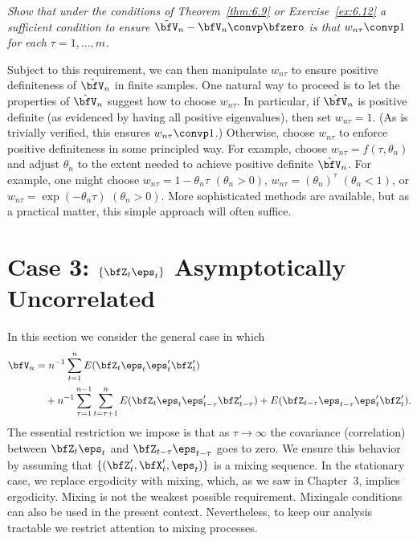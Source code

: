 \begin{exercises}
\item\label{ex:6.15} \textit{Show that under the conditions of Theorem~\ref{thm:6.9} or Exercise~\ref{ex:6.12} a sufficient condition to ensure $\tilde{\bfV}_n - \bfV_n \convp \bfzero$ is that $w_{n\tau} \convp 1$ for each $\tau = 1,\ldots,m$.}
\end{exercises}

Subject to this requirement, we can then manipulate $w_{n\tau}$ to ensure positive definiteness of $\tilde{\bfV}_n$ in finite samples. One natural way to proceed is to let the properties of $\hat{\bfV}_n$ suggest how to choose $w_{n\tau}$. In particular, if $\hat{\bfV}_n$ is positive definite (as evidenced by having all positive eigenvalues), then set $w_{n\tau} = 1$. (As is trivially verified, this ensures $w_{n\tau} \convp 1$.) Otherwise, choose $w_{n\tau}$ to enforce positive definiteness in some principled way. For example, choose $w_{n\tau} = f(\tau,\theta_n)$ and adjust $\theta_n$ to the extent needed to achieve positive definite $\tilde{\bfV}_n$. For example, one might choose $w_{n\tau} = 1 - \theta_n\tau$ $(\theta_n > 0)$, $w_{n\tau} = (\theta_n)^\tau$ $(\theta_n < 1)$, or $w_{n\tau} = \exp(-\theta_n\tau)$ $(\theta_n > 0)$. More sophisticated methods are available, but as a practical matter, this simple approach will often suffice.

\section{Case 3: \texorpdfstring{$\{\bfZ_t\eps_t\}$}{Zt et} Asymptotically Uncorrelated}\label{sec:case3}

In this section we consider the general case in which
\begin{align*}
  \bfV_n &= n^{-1}\sum_{t=1}^{n}E(\bfZ_t\eps_t\eps_t'\bfZ_t') \\
    &\quad + n^{-1}\sum_{\tau=1}^{n-1}\sum_{t=\tau+1}^{n}E(\bfZ_t\eps_t\eps_{t-\tau}'\bfZ_{t-\tau}') + E(\bfZ_{t-\tau}\eps_{t-\tau}\eps_t'\bfZ_t').
\end{align*}
The essential restriction we impose is that as $\tau \to \infty$ the covariance (correlation) between $\bfZ_t\eps_t$ and $\bfZ_{t-\tau}\eps_{t-\tau}$ goes to zero. We ensure this behavior by assuming that $\{(\bfZ_t',\bfX_t',\eps_t)\}$ is a mixing sequence. In the stationary case, we replace ergodicity with mixing, which, as we saw in Chapter~3, implies ergodicity. Mixing is not the weakest possible requirement. Mixingale conditions can also be used in the present context. Nevertheless, to keep our analysis tractable we restrict attention to mixing processes.

